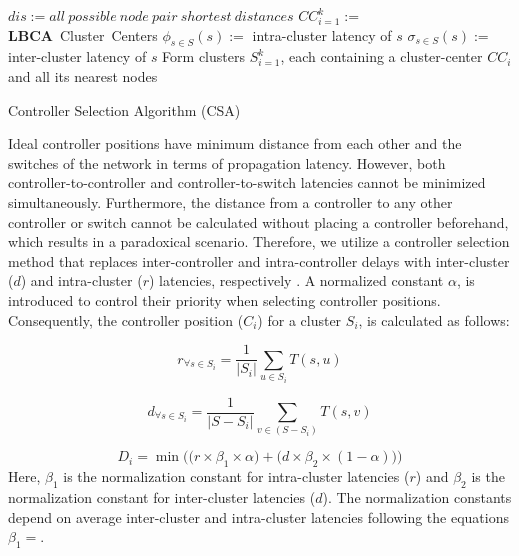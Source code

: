 \documentclass[final,5p,times]{cas-dc}
\begin{document}
	\begin{algorithm}
		\SetAlgoLined
		$dis := all~possible~node~pair~shortest~distances$\;
		$CC_{i=1}^k :=$ \textbf{LBCA}~Cluster~Centers\;
		$\phi_{s\in S}(s) :=$ intra-cluster latency of $s$\;
		$\sigma_{s\in S}(s) :=$ inter-cluster latency of $s$\;
		Form clusters $S_{i=1}^k$, each containing a cluster-center $CC_i$ and all its nearest nodes\;
		\caption{Controller Selection Algorithm (CSA)} \label{algo:csa}
	\end{algorithm}
	Ideal controller positions have minimum distance from each other and the switches of the network in terms of propagation latency. However, both controller-to-controller and controller-to-switch latencies cannot be minimized simultaneously. Furthermore, the distance from a controller to any other controller or switch cannot be calculated without placing a controller beforehand, which results in a paradoxical scenario. Therefore, we utilize a controller selection method that replaces inter-controller and intra-controller delays with inter-cluster ($d$) and intra-cluster ($r$) latencies, respectively \cite{aziz2019degree}. A normalized constant $\alpha$, is introduced to control their priority when selecting controller positions. Consequently, the controller position ($C_i$) for a cluster $S_i$, is calculated as follows:
	
	\begin{equation} \label{eqn:intra}
	r_{\forall s\in S_i} = \frac{1}{|S_i|}\sum_{u\in S_i} T(s,u)
	\end{equation}
	
	\begin{equation} \label{eqn:inter}
	d_{\forall s\in S_i} = \frac{1}{|S-S_i|}\sum_{v\in (S-S_i)} T(s,v)
	\end{equation}
	
	\begin{equation} \label{eqn:totlat}
	D_i = \min\bigg(\big( r\times \beta_1 \times \alpha \big) + \big( d \times \beta_2 \times (1-\alpha) \big) \bigg)
	\end{equation}
	Here, $\beta_1$ is the normalization constant for intra-cluster latencies ($r$) and $\beta_2$ is the normalization constant for inter-cluster latencies ($d$). The normalization constants depend on average inter-cluster and intra-cluster latencies following the equations $\beta_1 = $.
	
\end{document}
